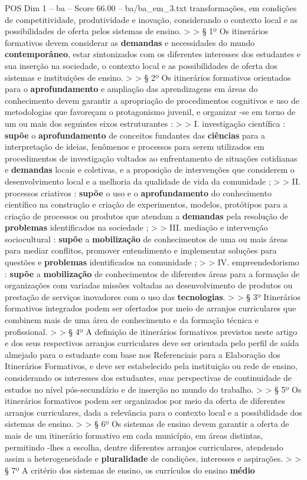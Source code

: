 \begin{textsample}{POS Dim 1 – ba – Score 66.00 – ba/ba\_em\_3.txt}
transformações, em condições de competitividade, produtividade e inovação, considerando o contexto local e as possibilidades de oferta pelos sistemas de ensino. > > § 1º Os itinerários formativos devem considerar as \textbf{demandas} e necessidades do mundo \textbf{contemporâneo}, estar sintonizados com os diferentes interesses dos estudantes e sua inserção na sociedade, o contexto local e as possibilidades de oferta dos sistemas e instituições de ensino. > > § 2º Os itinerários formativos orientados para o \textbf{aprofundamento} e ampliação das aprendizagens em áreas do conhecimento devem garantir a apropriação de procedimentos cognitivos e uso de metodologias que favoreçam o protagonismo juvenil, e organizar -se em torno de um ou mais dos seguintes eixos estruturantes : > > I. investigação científica : \textbf{supõe} o \textbf{aprofundamento} de conceitos fundantes das \textbf{ciências} para a interpretação de ideias, fenômenos e processos para serem utilizados em procedimentos de investigação voltados ao enfrentamento de situações cotidianas e \textbf{demandas} locais e coletivas, e a proposição de intervenções que considerem o desenvolvimento local e a melhoria da qualidade de vida da comunidade ; > > II. processos criativos : \textbf{supõe} o uso e o \textbf{aprofundamento} do conhecimento científico na construção e criação de experimentos, modelos, protótipos para a criação de processos ou produtos que atendam a \textbf{demandas} pela resolução de \textbf{problemas} identificados na sociedade ; > > III. mediação e intervenção sociocultural : \textbf{supõe} a \textbf{mobilização} de conhecimentos de uma ou mais áreas para mediar conflitos, promover entendimento e implementar soluções para questões e \textbf{problemas} identificados na comunidade ; > > IV. empreendedorismo : \textbf{supõe} a \textbf{mobilização} de conhecimentos de diferentes áreas para a formação de organizações com variadas missões voltadas ao desenvolvimento de produtos ou prestação de serviços inovadores com o uso das \textbf{tecnologias}. > > § 3º Itinerários formativos integrados podem ser ofertados por meio de arranjos curriculares que combinem mais de uma área de conhecimento e da formação técnica e profissional. > > § 4º A definição de itinerários formativos previstos neste artigo e dos seus respectivos arranjos curriculares deve ser orientada pelo perfil de saída almejado para o estudante com base nos Referenciais para a Elaboração dos Itinerários Formativos, e deve ser estabelecido pela instituição ou rede de ensino, considerando os interesses dos estudantes, suas perspectivas de continuidade de estudos no nível pós-secundário e de inserção no mundo do trabalho. > > § 5º Os itinerários formativos podem ser organizados por meio da oferta de diferentes arranjos curriculares, dada a relevância para o contexto local e a possibilidade dos sistemas de ensino. > > § 6º Os sistemas de ensino devem garantir a oferta de mais de um itinerário formativo em cada município, em áreas distintas, permitindo -lhes a escolha, dentre diferentes arranjos curriculares, atendendo assim a heterogeneidade e \textbf{pluralidade} de condições, interesses e aspirações. > > § 7º A critério dos sistemas de ensino, os currículos do ensino \textbf{médio} 
\end{textsample}
